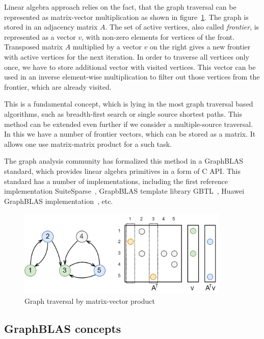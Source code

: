 Linear algebra approach relies on the fact, that the graph traversal can be represented as matrix-vector multiplication as shown in figure~\ref{fig:gt_mxv}. The graph is stored in an adjacency matrix $A$. The set of active vertices, also called \textit{frontier}, is represented as a vector $v$, with non-zero elements for vertices of the front. Transposed matrix $A$ multiplied by a vector $v$ on the right gives a new frontier with active vertices for the next iteration. In order to traverse all vertices only once, we have to store additional vector with visited vertices. This vector can be used in an inverse element-wise multiplication to filter out those vertices from the frontier, which are already visited. 

This is a fundamental concept, which is lying in the most graph traversal based algorithms, such as breadth-first search or single source shortest paths. This method can be extended even further if we consider a multiple-source traversal. In this we have a number of frontier vectors, which can be stored as a matrix. It allows one use matrix-matrix product for a such task.

The graph analysis community has formalized this method in a GraphBLAS~\cite{paper:graphblas_foundations} standard, which provides linear algebra primitives in a form of C API. This standard has a number of implementations, including the first reference implementation SuiteSparse~\cite{article:suite_sparse_for_graph_problems}, GrapbBLAS template library GBTL~\cite{article:gbtl}, Huawei GraphBLAS implementation~\cite{article:hu_graphblas_impl}, etc.

\begin{figure}[h]
    \centering
    \includegraphics[width=0.9\textwidth]{images/graph_traversal_mxv.png}
    \caption{Graph traversal by matrix-vector product}
    \label{fig:gt_mxv}
\end{figure}

\subsection{GraphBLAS concepts}

